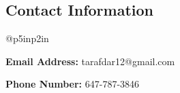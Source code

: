 \documentclass[margin,line]{res}
\newcommand{\onecol}[1]{
  \begin{minipage}{\linewidth}
    {#1}
  \end{minipage}
}
\begin{document}


\begin{resume}

\section{\sc Contact Information}
\vspace{.05in}
\begin{tabular}{@{}p{5in}p{2in}}

\onecol{\textbf{Email Address:} tarafdar12@gmail.com} {} 
\onecol{\textbf{Phone Number:} 647-787-3846} {} 
\end{tabular}


%


%

%

%
%
%

\end{resume}
\end{document}
